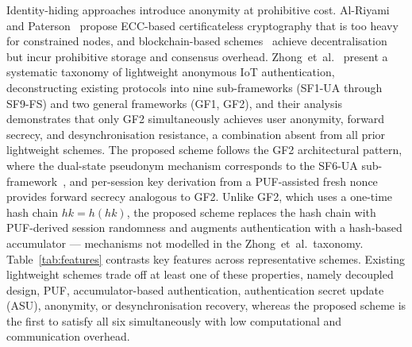 \documentclass[conference]{IEEEtran}
\begin{document}
Identity-hiding approaches introduce anonymity at prohibitive cost.
Al-Riyami and Paterson~\cite{alriyami2003cert} propose ECC-based certificateless
cryptography that is too heavy for constrained nodes, and blockchain-based
schemes~\cite{ahmed2023chains} achieve decentralisation but incur prohibitive
storage and consensus overhead.  Zhong~et~al.~\cite{zhong2025survey} present a
systematic taxonomy of lightweight anonymous IoT authentication, deconstructing
existing protocols into nine sub-frameworks (SF1-UA through SF9-FS) and two
general frameworks (GF1, GF2), and their analysis demonstrates that only GF2
simultaneously achieves user anonymity, forward secrecy, and desynchronisation
resistance, a combination absent from all prior lightweight schemes.  The
proposed scheme follows the GF2 architectural pattern, where the dual-state pseudonym
mechanism corresponds to the SF6-UA sub-framework~\cite{zhong2025survey}, and
per-session key derivation from a PUF-assisted fresh nonce provides forward
secrecy analogous to GF2.  Unlike GF2, which uses a one-time hash chain
$hk = h(hk)$, the proposed scheme replaces the hash chain with PUF-derived
session randomness and augments authentication with a hash-based
accumulator — mechanisms not modelled in the Zhong~et~al.\ taxonomy.
Table~\ref{tab:features} contrasts key features across representative schemes.
Existing lightweight schemes trade off at least one of these properties, namely
decoupled design, PUF, accumulator-based authentication, authentication secret update
(ASU), anonymity, or desynchronisation recovery, whereas the proposed scheme is
the first to satisfy all six simultaneously with low computational and communication overhead.
\end{document}
